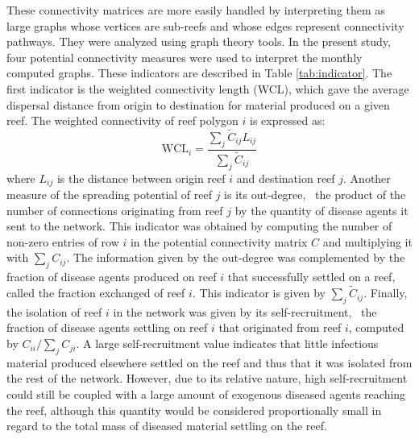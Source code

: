 These connectivity matrices are more easily handled by interpreting them as large graphs whose vertices are sub-reefs and whose edges represent connectivity pathways. They were analyzed using graph theory tools. In the present study, four potential connectivity measures were used to interpret the monthly computed graphs. These indicators are described in Table \ref{tab:indicator}. The first indicator is the weighted connectivity length (WCL), which gave the average dispersal distance from origin to destination for material produced on a given reef. The weighted connectivity of reef polygon $i$ is expressed as:
\begin{equation}
    \textrm{WCL}_i = \dfrac{\sum_j \tilde{C}_{ij} L_{ij}}{\sum_j \tilde{C}_{ij}}
\end{equation}
where $L_{ij}$ is the distance between origin reef $i$ and destination reef $j$. Another measure of the spreading potential of reef $j$ is its out-degree, \ie~the product of the number of connections originating from reef $j$ by the quantity of disease agents it sent to the network. This indicator was obtained by computing the number of non-zero entries of row $i$ in the potential connectivity matrix $C$ and multiplying it with $\sum_j C_{ij}$. The information given by the out-degree was complemented by the fraction of disease agents produced on reef $i$ that successfully settled on a reef, called the fraction exchanged of reef $i$. This indicator is given by $\sum_{j} \tilde{C}_{ij}$. Finally, the isolation of reef $i$ in the network was given by its self-recruitment, \ie~the fraction of disease agents settling on reef $i$ that originated from reef $i$, computed by $C_{ii}/\sum_jC_{ji}$. A large self-recruitment value indicates that little infectious material produced elsewhere settled on the reef and thus that it was isolated from the rest of the network. However, due to its relative nature, high self-recruitment could still be coupled with a large amount of exogenous diseased agents reaching the reef, although this quantity would be considered proportionally small in regard to the total mass of diseased material settling on the reef.

